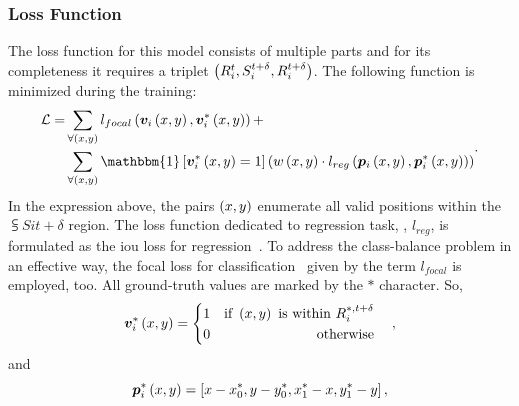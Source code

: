 \subsubsection{Loss Function}

The loss function for this model consists of multiple parts and for its completeness it requires a triplet $\left( {{R}_{i}^{t}, {S}_{i}^{t + \delta}, {R}_{i}^{t + \delta}} \right)$. The following function is minimized during the training:
\begin{equation}
    \begin{aligned}
        \lossf =
         & \sum_{\forall \rbrackets{x, y}}
        \func{l_{focal}}{
            \func{\mtxsub{v}{i}}{
                x, y
            },
            \func{\mtxsubsup{v}{i}{*}}{
                x, y
            }
        } +                                \\
         & \sum_{\forall \rbrackets{x, y}}
        \mathbbm{1}
        \sbrackets{
            \func{\mtxsubsup{v}{i}{*}}{
                x, y
            } = 1
        }
        \rbrackets{
            \func{w}{x, y}
            \cdot
            \func{l_{reg}}{
                \func{\mtxsub{p}{i}}{x, y},
                \func{\mtxsubsup{p}{i}{*}}{x, y}
            }
        }
    \end{aligned}.
\end{equation}
In the expression above, the pairs $\left( {x, y} \right)$ enumerate all valid positions within the $\subsup{S}{i}{t + \delta}$ region. The loss function dedicated to regression task, \ietext{}, $l_{reg}$, is formulated as the \gls{iou} loss for regression~\cite{danelljan2019atom, yu2016unitbox}. To address the class-balance problem in an effective way, the focal loss for classification~\cite{lin2018focal} given by the term $l_{focal}$ is employed, too. All ground-truth values are marked by the $*$ character. So,
\begin{equation}
    {\bm{v}_{i}^{*}} \left( x, y \right) =
    \begin{cases}
        \begin{aligned}
             & 1 & \text{if } \left( {x, y} \right) \text{ is within } {R}_{i}^{*, t + \delta} \\
             & 0 & \text{otherwise}                                                            \\
        \end{aligned}
    \end{cases},
\end{equation}
and
\begin{equation}
    {\bm{p}_{i}^{*}} \left( x, y \right) =
    \left[ {
        x - {x}_{0}^{*},
        y - {y}_{0}^{*},
        {x}_{1}^{*} - x,
        {y}_{1}^{*} - y
    } \right],
\end{equation}

